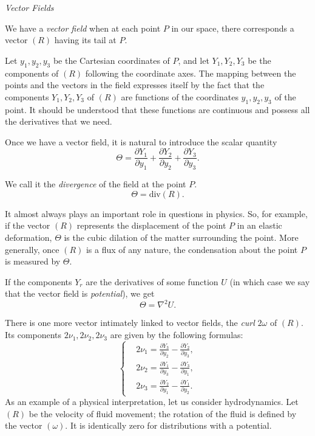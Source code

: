 \documentclass{book}
\begin{document}
\emph{Vector Fields}

We have a \emph{vector field} when at each point $P$ in our space, there corresponds a vector $(R)$ having its tail at $P$. 

Let $y_1,y_2,y_3$ be the Cartesian coordinates of $P$, and let $Y_1,Y_2,Y_3$ be the components of $(R)$ following the coordinate axes. The mapping between the points and the vectors in the field expresses itself by the fact that the components $Y_1,Y_2,Y_3$ of $(R)$ are functions of the coordinates $y_1,y_2,y_3$ of the point. It should be understood that these functions are continuous and possess all the derivatives that we need.

Once we have a vector field, it is natural to introduce the scalar quantity
\begin{equation}
\Theta=\frac{\partial Y_1}{\partial y_1}+\frac{\partial Y_2}{\partial y_2}+\frac{\partial Y_3}{\partial y_3}.
\end{equation}

We call it the \emph{divergence} of the field at the point $P$.
$$\Theta=\text{div}(R).$$

It almost always plays an important role in questions in physics. So, for example, if the vector $(R)$ represents the displacement of the point $P$ in an elastic deformation, $\Theta$ is the cubic dilation of the matter surrounding the point. More generally, once $(R)$ is a flux of any nature, the condensation about the point $P$ is measured by $\Theta$.

If the components $Y_r$ are the derivatives of some function $U$ (in which case we say that the vector field is \emph{potential}), we get
\begin{equation*}
\Theta=\nabla^2U.
\tag{1'}
\end{equation*}

There is one more vector intimately linked to vector fields, the \emph{curl} $2\omega$ of $(R)$. Its components $2\nu_1,2\nu_2,2\nu_3$ are given by the following formulas:
\begin{equation}
\begin{cases}
&2\nu_1=\frac{\partial Y_3}{\partial y_2}-\frac{\partial Y_2}{\partial y_3},\\
&2\nu_2=\frac{\partial Y_1}{\partial y_3}-\frac{\partial Y_3}{\partial y_1},\\
&2\nu_3=\frac{\partial Y_2}{\partial y_1}-\frac{\partial Y_1}{\partial y_2}.
\end{cases}
\end{equation}
As an example of a physical interpretation, let us consider hydrodynamics. Let $(R)$ be the velocity of fluid movement; the rotation of the fluid is defined by the vector $(\omega)$. It is identically zero for distributions with a potential.
\end{document}
